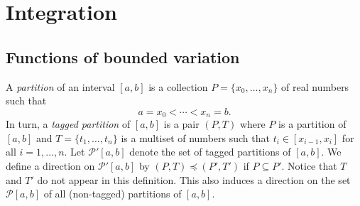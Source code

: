 \documentclass[article, a4paper, 11pt, oneside]{memoir}
\numberwithin{equation}{chapter}
\newcommand{\calP}{\mathcal{P}}
\begin{document}
        
        



\chapter{Integration}

\section{Functions of bounded variation}

A \emph{partition} of an interval $[a,b]$ is a collection $P = \{x_0, \ldots, x_n \}$ of real numbers such that
%
\begin{equation*}
    a = x_0 < \cdots < x_n = b.
\end{equation*}
%
In turn, a \emph{tagged partition} of $[a,b]$ is a pair $(P,T)$ where $P$ is a partition of $[a,b]$ and $T = \{t_1, \ldots, t_n\}$ is a multiset of numbers such that $t_i \in [x_{i-1}, x_i]$ for all $i = 1, \ldots, n$. Let $\calP'[a,b]$ denote the set of tagged partitions of $[a,b]$. We define a direction on $\calP'[a,b]$ by $(P,T) \preceq (P',T')$ if $P \subseteq P'$. Notice that $T$ and $T'$ do not appear in this definition. This also induces a direction on the set $\calP[a,b]$ of all (non-tagged) partitions of $[a,b]$.
\end{document}
